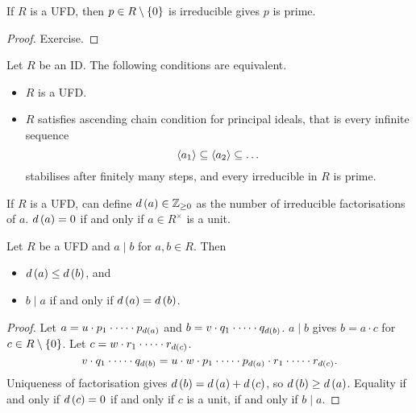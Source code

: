 \begin{lemma}
If $ R $ is a UFD, then $ p \in R \setminus \left\{ 0 \right\} $ is irreducible gives $ p $ is prime.
\end{lemma}

\begin{proof}
Exercise.
\end{proof}

\begin{theorem}
\label{thm:ufdacc}
Let $ R $ be an ID. The following conditions are equivalent.
\begin{itemize}
\item $ R $ is a UFD.
\item $ R $ satisfies ascending chain condition for principal ideals, that is every infinite sequence
$$ \left\langle a_1 \right\rangle \subseteq \left\langle a_2 \right\rangle \subseteq \dots $$
stabilises after finitely many steps, and every irreducible in $ R $ is prime.
\end{itemize}
\end{theorem}

If $ R $ is a UFD, can define $ d\left( a \right) \in \mathbb{Z}_{\ge 0} $ as the number of irreducible factorisations of $ a $. $ d\left( a \right) = 0 $ if and only if $ a \in R^\times $ is a unit.

\begin{lemma}
Let $ R $ be a UFD and $ a \mid b $ for $ a, b \in R $. Then
\begin{itemize}
\item $ d\left( a \right) \le d\left( b \right) $, and
\item $ b \mid a $ if and only if $ d\left( a \right) = d\left( b \right) $.
\end{itemize}
\end{lemma}


\begin{proof}
Let $ a = u \cdot p_1 \cdot \dots \cdot p_{d\left( a \right)} $ and $ b = v \cdot q_1 \cdot \dots \cdot q_{d\left( b \right)} $. $ a \mid b $ gives $ b = a \cdot c $ for $ c \in R \setminus \left\{ 0 \right\} $. Let $ c = w \cdot r_1 \cdot \dots \cdot r_{d\left( c \right)} $.
$$ v \cdot q_1 \cdot \dots \cdot q_{d\left( b \right)} = u \cdot w \cdot p_1 \cdot \dots \cdot p_{d\left( a \right)} \cdot r_1 \cdot \dots \cdot r_{d\left( c \right)}. $$
Uniqueness of factorisation gives $ d\left( b \right) = d\left( a \right) + d\left( c \right) $, so $ d\left( b \right) \ge d\left( a \right) $. Equality if and only if $ d\left( c \right) = 0 $ if and only if $ c $ is a unit, if and only if $ b \mid a $.
\end{proof}

